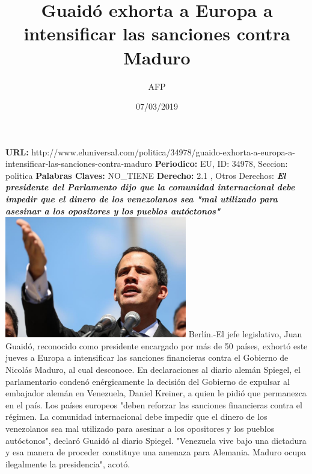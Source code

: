 \documentclass{article}%
\title{\textbf{Guaidó exhorta a Europa a intensificar las sanciones contra Maduro}}%
\author{AFP}%
\date{07/03/2019}%
\begin{document}
%
\normalsize%
\maketitle%
\textbf{URL: }%
http://www.eluniversal.com/politica/34978/guaido{-}exhorta{-}a{-}europa{-}a{-}intensificar{-}las{-}sanciones{-}contra{-}maduro\newline%
%
\textbf{Periodico: }%
EU, %
ID: %
34978, %
Seccion: %
politica\newline%
%
\textbf{Palabras Claves: }%
NO\_TIENE\newline%
%
\textbf{Derecho: }%
2.1%
, Otros Derechos: %
\newline%
%
\textbf{\textit{El presidente del Parlamento dijo que la comunidad internacional debe impedir que el dinero de los venezolanos sea "mal utilizado para asesinar a los opositores y los pueblos autóctonos"}}%
\newline%
\newline%
%
\includegraphics[width=300px]{EU_34978.jpg}%
\newline%
%
Berlín.{-}El jefe legislativo, Juan Guaidó, reconocido como presidente encargado por más de 50 países, exhortó este jueves a Europa a intensificar las sanciones financieras contra el Gobierno de Nicolás Maduro, al cual desconoce.%
\newline%
%
En declaraciones al diario alemán Spiegel, el parlamentario condenó enérgicamente la decisión del Gobierno de expulsar al embajador alemán en Venezuela, Daniel Kreiner, a quien le pidió que permanezca en el país.%
\newline%
%
Los países europeos "deben reforzar las sanciones financieras contra el régimen. La comunidad internacional debe impedir que el dinero de los venezolanos sea mal utilizado para asesinar a los opositores y los pueblos autóctonos", declaró Guaidó al diario Spiegel.%
\newline%
%
"Venezuela vive bajo una dictadura y esa manera de proceder constituye una amenaza para Alemania. Maduro ocupa ilegalmente la presidencia", acotó.%
\end{document}
